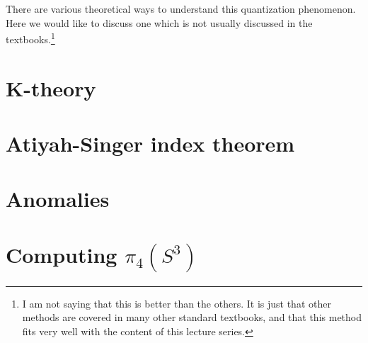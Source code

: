 \documentclass[12pt]{article}
\numberwithin{equation}{section}
\theoremstyle{remark}
\begin{document}
There are various theoretical ways to understand this quantization phenomenon.
Here we would like to discuss one which is not usually discussed in the textbooks.\footnote{%
I am not saying that this is better than the others.
It is just that other methods are covered in many other standard textbooks,
and that this method fits very well with the content of this lecture series.}



\section{K-theory}

\section{Atiyah-Singer index theorem}

\section{Anomalies}

\section{Computing \texorpdfstring{$\pi_4(S^3)$}{pi4(S3)}}
\fi



\end{document}
